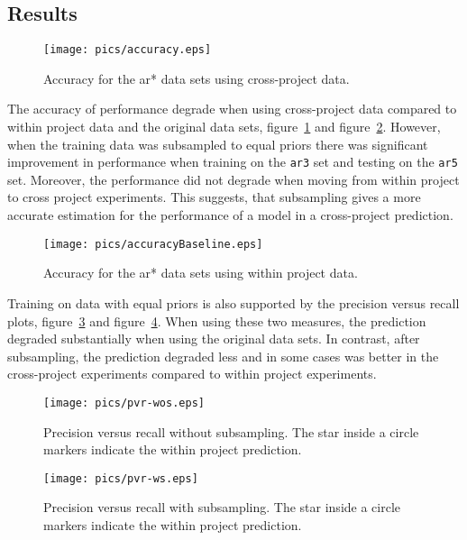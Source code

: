 \documentclass{sig-alternate}
\begin{document}
\subsection{Results}
\begin{figure}[tbp]
\begin{center}
\texttt{[image: pics/accuracy.eps]}
\caption{Accuracy for the ar* data sets using cross-project data.}
\label{fig:accuracy}
\end{center}
\end{figure}
The accuracy of performance degrade when using cross-project data compared to within project data and the
original data sets, figure~\ref{fig:accuracy} and figure~\ref{fig:accuBase}. However, when the training data was
subsampled to equal priors there was significant improvement in performance when training on the {\tt ar3} set
and testing on the {\tt ar5} set. Moreover, the performance did not degrade when moving from within project to
cross project experiments. This suggests, that subsampling gives a more accurate  estimation for the
performance of a model in a cross-project prediction.
\begin{figure}[tbp]
\begin{center}
\texttt{[image: pics/accuracyBaseline.eps]}
\caption{Accuracy for the ar* data sets using within project data.}
\label{fig:accuBase}
\end{center}
\end{figure}
Training on data with equal priors is also supported by the precision versus recall plots, figure~\ref{fig:pvr-wos}
and figure~\ref{fig:pvr-ws}. When using these two measures, the prediction degraded substantially when using
the original data sets. In contrast, after subsampling, the prediction degraded less and in some cases was better
in the cross-project experiments compared to within project experiments.
\begin{figure}[tbp]
\begin{center}
\texttt{[image: pics/pvr-wos.eps]}
\caption{Precision versus recall without subsampling. The star inside a circle markers indicate the within project prediction.}
\label{fig:pvr-wos}
\end{center}
\end{figure}

\begin{figure}[tbp]
\begin{center}
\texttt{[image: pics/pvr-ws.eps]}
\caption{Precision versus recall with subsampling. The star inside a circle markers indicate the within project prediction.}
\label{fig:pvr-ws}
\end{center}
\end{figure}
\end{document}
